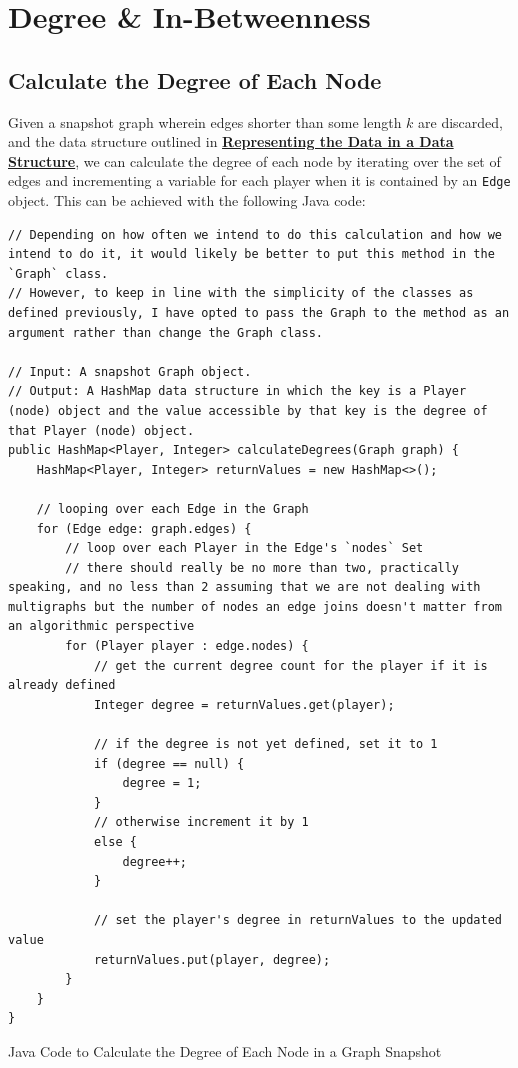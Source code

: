 \documentclass[a4paper,11pt]{article}
\newenvironment{code}{\captionsetup{type=listing}}{}
\begin{document}
\section{Degree \& In-Betweenness}
\subsection{Calculate the Degree of Each Node}
Given a snapshot graph wherein edges shorter than some length $k$ are discarded, and the data structure outlined 
in \textbf{\hyperref[sec:data_structure]{Representing the Data in a Data Structure}}, we can calculate the degree 
of each node by iterating over the set of edges and incrementing a variable for each player when it is contained 
by an \texttt{Edge} object.
This can be achieved with the following Java code:

\begin{code}
\begin{verbatim}
// Depending on how often we intend to do this calculation and how we intend to do it, it would likely be better to put this method in the `Graph` class.
// However, to keep in line with the simplicity of the classes as defined previously, I have opted to pass the Graph to the method as an argument rather than change the Graph class.

// Input: A snapshot Graph object.
// Output: A HashMap data structure in which the key is a Player (node) object and the value accessible by that key is the degree of that Player (node) object.
public HashMap<Player, Integer> calculateDegrees(Graph graph) {
    HashMap<Player, Integer> returnValues = new HashMap<>();

    // looping over each Edge in the Graph
    for (Edge edge: graph.edges) {
        // loop over each Player in the Edge's `nodes` Set
        // there should really be no more than two, practically speaking, and no less than 2 assuming that we are not dealing with multigraphs but the number of nodes an edge joins doesn't matter from an algorithmic perspective
        for (Player player : edge.nodes) {
            // get the current degree count for the player if it is already defined
            Integer degree = returnValues.get(player);

            // if the degree is not yet defined, set it to 1
            if (degree == null) {
                degree = 1;
            }
            // otherwise increment it by 1
            else {
                degree++;
            }

            // set the player's degree in returnValues to the updated value
            returnValues.put(player, degree);
        }
    }
}
\end{verbatim}
\caption{Java Code to Calculate the Degree of Each Node in a Graph Snapshot}
\end{code}
\end{document}
